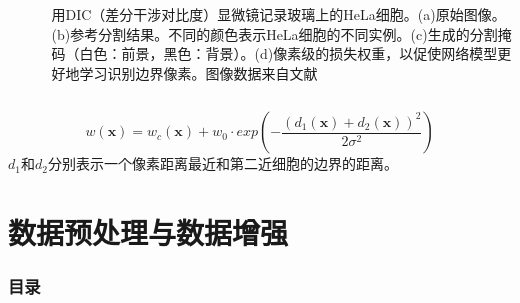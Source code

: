 \documentclass{beamer}%
\begin{document}
\begin{frame}
\begin{columns}
\begin{column}{0.6\linewidth}
\begin{figure}
\label{fig:fastdata}
\end{figure}

	\end{column}

	\begin{column}{0.4\linewidth}
   \footnotesize
			用DIC（差分干涉对比度）显微镜记录玻璃上的HeLa细胞。(a)原始图像。(b)参考分割结果。不同的颜色表示HeLa细胞的不同实例。(c)生成的分割掩码（白色：前景，黑色：背景）。(d)像素级的损失权重，以促使网络模型更好地学习识别边界像素。图像数据来自文献\citet{Unet2015Olaf}
	\end{column}
\end{columns}


{\setlength\abovedisplayskip{0.1cm}
\setlength\belowdisplayskip{0.1cm}
\begin{equation}\label{equ:weights}
    w(\mathbf{x}) = w_c(\mathbf{x}) + w_0 \cdot exp(-\frac{ (d_1 (\mathbf{x}) + d_2(\mathbf{x}) )^2  }{2\sigma^2})
\end{equation}
}
$d_1$和$d_2$分别表示一个像素距离最近和第二近细胞的边界的距离。


\end{frame}




\section{数据预处理与数据增强}
\begin{frame}[allowframebreaks]
  \frametitle{\textsc{目录}} \vspace{-0.3cm}
    \begin{spacing}{0.0}
    \end{spacing}   %
\end{frame}
\end{document}
